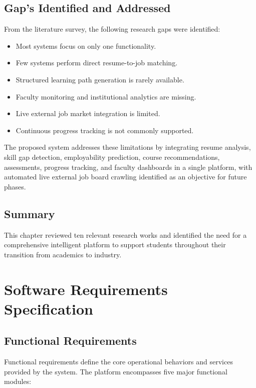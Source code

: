 \documentclass[12pt,a4paper]{report}
\begin{document}
\section{Gap's Identified and Addressed}
From the literature survey, the following research gaps were identified:
\begin{itemize}
    \item Most systems focus on only one functionality.
    \item Few systems perform direct resume-to-job matching.
    \item Structured learning path generation is rarely available.
    \item Faculty monitoring and institutional analytics are missing.
    \item Live external job market integration is limited.
    \item Continuous progress tracking is not commonly supported.
\end{itemize}

\par
The proposed system addresses these limitations by integrating resume analysis, skill gap detection, employability prediction, course recommendations, assessments, progress tracking, and faculty dashboards in a single platform, with automated live external job board crawling identified as an objective for future phases.

\section{Summary}
This chapter reviewed ten relevant research works and identified the need for a comprehensive intelligent platform to support students throughout their transition from academics to industry.


\chapter{Software Requirements Specification}

\section{Functional Requirements}
Functional requirements define the core operational behaviors and services provided by the system. The platform encompasses five major functional modules:
\end{document}
